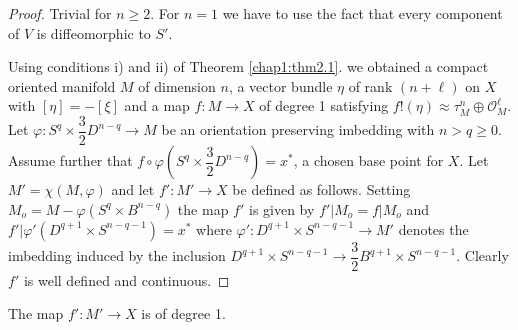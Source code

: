 \begin{proof}%
Trivial for $n\geq 2$. For $n = 1$ we have to use the fact that every
component of $V$ is diffeomorphic to $S'$.  

Using conditions i) and ii) of Theorem \ref{chap1:thm2.1}. we obtained a compact
oriented manifold $M$ of dimension $n$, a vector bundle $\eta$ of
rank $(n + \ell)$ on $X$ with $[\eta] = - [\xi]$ and a map $f: M
\rightarrow X$ of degree 1 satisfying $f!(\eta)\approx \tau^n_M
\oplus \mathscr{O}^\ell_M$. Let $\varphi: S^q\times \dfrac{3}{2}
D^{n-q}\rightarrow M$ be an orientation preserving imbedding with $n>
q \geq 0$. Assume further that $f \circ \varphi(S^q
\times\dfrac{3}{2}D^{n-q}) = x^*$, a chosen base point for $X$. Let
$M' = \chi(M, \varphi)$ and let $f' : M' \rightarrow X$ be defined as
follows. Setting $M_o = M - \varphi(S^q \times B^{n-q})$ the map $f'$ is
given by $f'  | M_o = f|M_o$ and $f'|\varphi ' (D^{q+1}\times
S^{n-q-1}) = x^*$ where $\varphi': D^{q+1}\times S^{n-q-1}\rightarrow
M'$ denotes the imbedding induced by the inclusion $D^{q+1} \times 
S^{n-q-1} \to \dfrac{3}{2} B^{q+1} \times S^{n-q-1}$. Clearly $f'$ is
well defined and continuous.   
\end{proof}

\begin{lemma}\label{chap1:lem3.3}%
 The map $f' : M' \rightarrow X$ is of degree 1.
\end{lemma}


